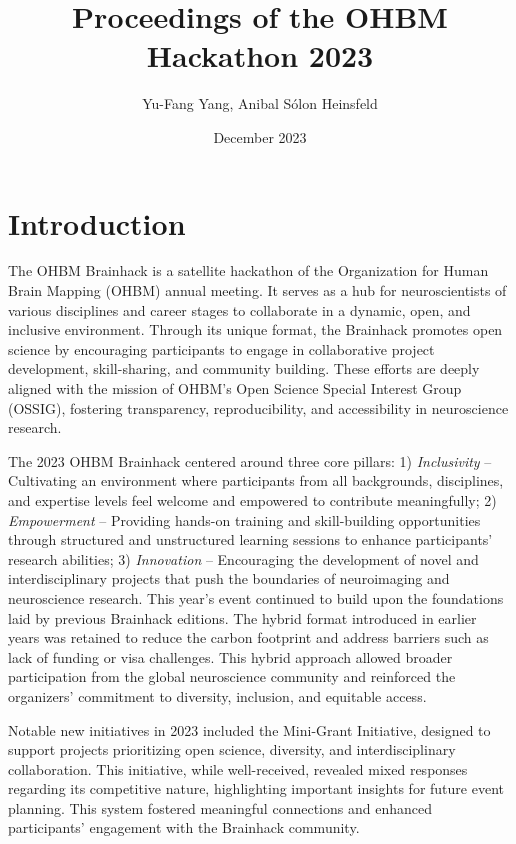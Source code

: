 \documentclass{article}
\title{Proceedings of the OHBM Hackathon 2023}
\author{Yu-Fang Yang, Anibal Sólon Heinsfeld}
\date{December 2023}
\begin{document}
\maketitle

\section{Introduction}

The OHBM Brainhack is a satellite hackathon of the Organization for Human Brain Mapping (OHBM) annual meeting.
It serves as a hub for neuroscientists of various disciplines and career stages to collaborate in a dynamic, open, and inclusive environment.
Through its unique format, the Brainhack promotes open science by encouraging participants to engage in collaborative project development, skill-sharing, and community building.
These efforts are deeply aligned with the mission of OHBM’s Open Science Special Interest Group (OSSIG), fostering transparency, reproducibility, and accessibility in neuroscience research.

The 2023 OHBM Brainhack centered around three core pillars:
1) \emph{Inclusivity} – Cultivating an environment where participants from all backgrounds, disciplines, and expertise levels feel welcome and empowered to contribute meaningfully;
2) \emph{Empowerment} – Providing hands-on training and skill-building opportunities through structured and unstructured learning sessions to enhance participants' research abilities;
3) \emph{Innovation} – Encouraging the development of novel and interdisciplinary projects that push the boundaries of neuroimaging and neuroscience research.
This year’s event continued to build upon the foundations laid by previous Brainhack editions.
The hybrid format introduced in earlier years was retained to reduce the carbon footprint \cite{Epp2023} and address barriers such as lack of funding or visa challenges.
This hybrid approach allowed broader participation from the global neuroscience community and reinforced the organizers' commitment to diversity, inclusion, and equitable access.

Notable new initiatives in 2023 included the Mini-Grant Initiative, designed to support projects prioritizing open science, diversity, and interdisciplinary collaboration.
This initiative, while well-received, revealed mixed responses regarding its competitive nature, highlighting important insights for future event planning.
This system fostered meaningful connections and enhanced participants' engagement with the Brainhack community.
\end{document}
